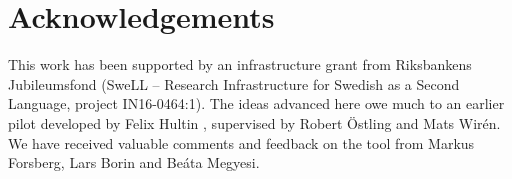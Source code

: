 \documentclass[10pt, a4paper]{article}
\begin{document}


\section{Acknowledgements}

This work has been supported by an infrastructure grant from Riksbankens Jubileumsfond (SweLL -- Research Infrastructure for Swedish as a Second Language, project IN16-0464:1). The ideas advanced here owe much to an earlier pilot developed by Felix Hultin \cite{correctAnnotator}, supervised by Robert Östling and Mats Wirén. We have received valuable comments and feedback on the tool from Markus Forsberg, Lars Borin and Beáta Megyesi.
\end{document}
